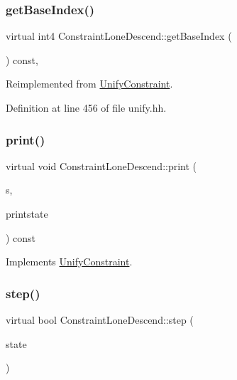 \subsubsection{\texorpdfstring{getBaseIndex()}{getBaseIndex()}}
{\footnotesize\ttfamily virtual int4 Constraint\+Lone\+Descend\+::get\+Base\+Index (\begin{DoxyParamCaption}\item[{void}]{ }\end{DoxyParamCaption}) const\hspace{0.3cm}{\ttfamily [inline]}, {\ttfamily [virtual]}}



Reimplemented from \mbox{\hyperlink{class_unify_constraint_a44f0164f38ac1fdc44fc73ebe7678de1}{Unify\+Constraint}}.



Definition at line 456 of file unify.\+hh.

\mbox{\label{class_constraint_lone_descend_a22365ca256a752326c21a3f71c796203}} 
\subsubsection{\texorpdfstring{print()}{print()}}
{\footnotesize\ttfamily virtual void Constraint\+Lone\+Descend\+::print (\begin{DoxyParamCaption}\item[{ostream \&}]{s,  }\item[{\mbox{\hyperlink{class_unify_c_printer}{Unify\+C\+Printer}} \&}]{printstate }\end{DoxyParamCaption}) const\hspace{0.3cm}{\ttfamily [virtual]}}



Implements \mbox{\hyperlink{class_unify_constraint_a774f6a611a96384766cb8e8d8f5ff41f}{Unify\+Constraint}}.

\mbox{\label{class_constraint_lone_descend_a792c77fd74feb948f4fcf8f3ce57b4f3}} 
\subsubsection{\texorpdfstring{step()}{step()}}
{\footnotesize\ttfamily virtual bool Constraint\+Lone\+Descend\+::step (\begin{DoxyParamCaption}\item[{\mbox{\hyperlink{class_unify_state}{Unify\+State}} \&}]{state }\end{DoxyParamCaption})\hspace{0.3cm}{\ttfamily [virtual]}}



